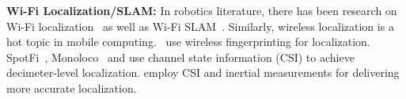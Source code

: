 \textbf{Wi-Fi Localization/SLAM:} 
In robotics literature, there has been research on Wi-Fi localization~\cite{biswas-icra10,loc-unc-5} as well as Wi-Fi SLAM~\cite{loc-unc-7,thrun:wifi-slam,wifi-n-slam-2}. 
Similarly, wireless localization is a hot topic in mobile computing.~\cite{yang-mobicom12,luo-ipsn14} use wireless fingerprinting for localization. 
SpotFi~\cite{kotaru-sigcomm15}, Monoloco~\cite{soltanaghaei-mobisys18} and \cite{karanam_ipsn18} use channel state information (CSI) to achieve decimeter-level localization. 
\cite{kumar2018indoor} employ CSI and inertial measurements for delivering more accurate localization. 

